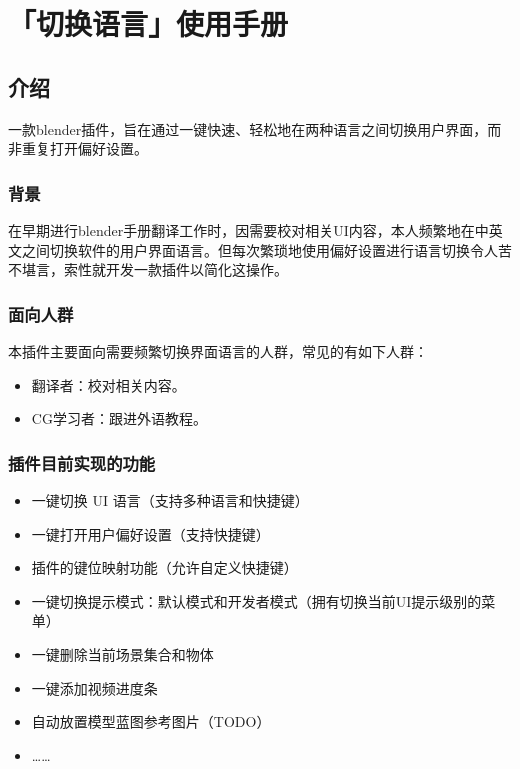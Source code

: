 \documentclass{../../public_resources/doc}
\begin{document}
\maketitle
\frontmatter
{}
{}
\mainmatter

\chapter{「切换语言」使用手册}
\section{介绍}
一款blender插件，旨在通过一键快速、轻松地在两种语言之间切换用户界面，而非重复打开偏好设置。

\subsection{背景}
在早期进行blender手册翻译工作时，因需要校对相关UI内容，本人频繁地在中英文之间切换软件的用户界面语言。但每次繁琐地使用偏好设置进行语言切换令人苦不堪言，索性就开发一款插件以简化这操作。

\subsection{面向人群}
本插件主要面向需要频繁切换界面语言的人群，常见的有如下人群：
\begin{itemize}
    \item 翻译者：校对相关内容。
    \item CG学习者：跟进外语教程。
\end{itemize}

\subsection{插件目前实现的功能}
\begin{itemize}
    \item 一键切换 UI 语言（支持多种语言和快捷键）
    \item 一键打开用户偏好设置（支持快捷键）
    \item 插件的键位映射功能（允许自定义快捷键）
    \item 一键切换提示模式：默认模式和开发者模式（拥有切换当前UI提示级别的菜单）
    \item 一键删除当前场景集合和物体
    \item 一键添加视频进度条
    \item 自动放置模型蓝图参考图片（TODO）
    \item ……
\end{itemize}
\end{document}
